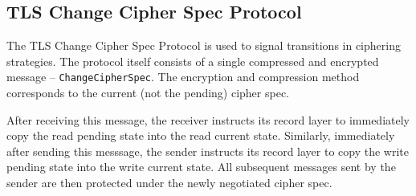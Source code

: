 
\subsection{TLS Change Cipher Spec Protocol} \label{change_cipher_spec}
    The TLS Change Cipher Spec Protocol is used to signal transitions in
    ciphering strategies. The protocol itself consists of a single compressed
    and encrypted message -- \texttt{ChangeCipherSpec}. The encryption and
    compression method corresponds to the current (not the pending) cipher
    spec.

    After receiving this message, the receiver instructs its record layer
    to immediately copy the read pending state into the read current state.
    Similarly, immediately after sending this messsage, the sender instructs
    its record layer to copy the write pending state into the write current
    state. All subsequent messages sent by the sender are then protected under
    the newly negotiated cipher spec.

